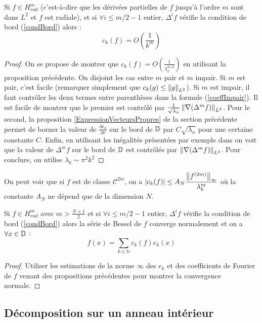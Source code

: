 \documentclass[11pt,a4paper]{article}
\begin{document}
\begin{Prop} Si $f \in H^m_{rad}$ (c'est-à-dire que les dérivées partielles de $f$ jusqu'à l'ordre $m$ sont dans $L^2$ et $f$ est radiale), et si $\forall i \leq m/2-1$ entier, $\Delta^i f$ vérifie la condition de bord (\ref{condBord}) alors : \[ c_k(f) = O\left(\frac{1}{k^m}\right)\] 
\begin{proof}
On se propose de montrer que $c_k(f) = O\left(\frac{1}{\lambda_k^{m/2}}\right)$ en utilisant la proposition précédente. On disjoint les cas entre $m$ pair et $m$ impair. Si $m$ est pair, c'est facile (remarquer simplement que $c_k(g) \leq \left\|g\right\|_{L^2}$). Si $m$ est impair, il faut contrôler les deux termes entre parenthèses dans la formule (\ref{coeffImpair}). Il est facile de montrer que le premier est contrôlé par $\frac{1}{\sqrt{\lambda_n}}\left\|\nabla(\Delta^m f)\right\|_{L^2}$. Pour le second, la proposition \ref{ExpressionVecteursPropres} de la section précédente permet de borner la valeur de $\frac{\partial e_n}{\partial r}$ sur le bord de $\mathbb{D}$ par $C \sqrt{\lambda_n}$ pour une certaine constante $C$. Enfin, en utilisant les inégalités présentées par exemple dans \cite{de2014elementary} on voit que la valeur de $\Delta^m f$ sur le bord de $\mathbb{D}$ est contrôlée par $\left\|\nabla(\Delta^m f)\right\|_{L^2}$. 
Pour conclure, on utilise $\lambda_k \sim \pi^2k^2$
\end{proof}
\end{Prop}

\begin{Rem} On peut voir que si $f$ est de classe $\mathcal{C}^{2m}$, on a $|c_k(f)| \leq A_N \dfrac{\left\|f^{(2m)}\right\|_{\infty}}{\lambda_k^m}$ où la constante $A_N$ ne dépend que de la dimension $N$. 
\end{Rem}

\begin{Prop} Si $f \in H_{rad}^m$ avec $m > \frac{N+1}{2}$ et si $\forall i \leq m/2-1$ entier, $\Delta^i f$ vérifie la condition de bord (\ref{condBord})  alors la série de Bessel de $f$ converge normalement et on a $\forall x \in \mathbb{D}$ : \[ f(x) = \sum_{k\in \mathbb{N}} c_k(f)e_k(x)\]
\begin{proof}
Utiliser les estimations de la norme $\infty$ des $e_k$ et des coefficients de Fourier de $f$ venant des propositions précédentes pour montrer la convergence normale. 
\end{proof}

\end{Prop}

\subsection{Décomposition sur un anneau intérieur}
\end{document}

